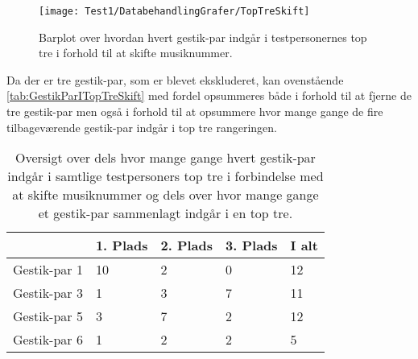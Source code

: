 %
\begin{figure}[H]
	\centering
	\texttt{[image: Test1/DatabehandlingGrafer/TopTreSkift]}
	\caption{Barplot over hvordan hvert gestik-par indgår i testpersonernes top tre i forhold til at skifte musiknummer.}
	\label{fig:SamletTopTreSkift}
\end{figure}
\noindent
%
Da der er tre gestik-par, som er blevet ekskluderet, kan ovenstående  \autoref{tab:GestikParITopTreSkift} med fordel opsummeres både i forhold til at fjerne de tre gestik-par men også i forhold til at opsummere hvor mange gange de fire tilbageværende gestik-par indgår i top tre rangeringen. 
%
\begin{table}[H]
	\centering
	\begin{tabular}{ | p{2.4cm} | p{2.4cm} | p{2.4cm} | p{2.4cm} |p{2.4cm}|}
		\hline
		& 1. Plads & 2. Plads & 3. Plads & I alt \\ \hline
		Gestik-par 1 & 10 & 2 & 0 & 12\\ \hline
		Gestik-par 3 & 1 & 3 & 7 & 11\\ \hline
		Gestik-par 5 & 3 & 7 & 2 & 12\\ \hline 
		Gestik-par 6 & 1 & 2 & 2 & 5\\ \hline
	\end{tabular}
	\caption{Oversigt over dels hvor mange gange hvert gestik-par indgår i samtlige testpersoners top tre i forbindelse med at skifte musiknummer og dels over hvor mange gange et gestik-par sammenlagt indgår i en top tre.}
	\label{tab:GestikParITopTreSkiftOversigt}
\end{table}
\noindent
%
